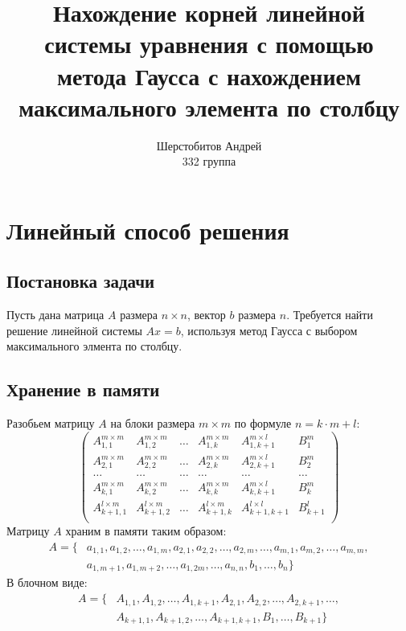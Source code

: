 \documentclass[12pt]{report}
\title{Нахождение корней 
    линейной системы уравнения
    с помощью метода Гаусса с 
    нахождением максимального элемента 
    по столбцу}
\author{Шерстобитов Андрей \\
         332 группа}
\begin{document}
    \maketitle
\newpage    
    \tableofcontents
    
\newpage
    \chapter{Линейный способ решения}
    \section{Постановка задачи} \label{lin:task}

    \quad Пусть дана матрица $A$ размера $n \times n$, вектор $b$ размера $n$. 
    Требуется найти решение линейной системы $Ax = b$, используя метод
    Гаусса с выбором максимального элмента по столбцу.
    

    \section{Хранение в памяти} \label{lin:mem}
    \quad Разобьем матрицу $A$ на блоки размера $m \times m$ 
    по формуле $ n = k \cdot m + l $:
    \[
    \left(
    \begin{array}{ccccc|c}
        A_{1,1}^{m \times m}   & A_{1,2}^{m \times m}   & \ldots & A_{1,k}^{m \times m}   & A_{1,k+1}^{m \times l}    & B^{m}_{1}   \\
        A_{2,1}^{m \times m}   & A_{2,2}^{m \times m}   & \ldots & A_{2,k}^{m \times m}   & A_{2,k+1}^{m \times l}    & B^{m}_{2}   \\
        \ldots                 & \ldots                 & \ldots & \ldots                 & \ldots                    & \ldots      \\
        A_{k,1}^{m \times m}   & A_{k,2}^{m \times m}   & \ldots & A_{k,k}^{m \times m}   & A_{k,k+1}^{m \times l}    & B^{m}_{k}   \\
        A_{k+1,1}^{l \times m} & A_{k+1,2}^{l \times m} & \ldots & A_{k+1,k}^{l \times m} & A_{k+1, k+1}^{l \times l} & B^{l}_{k+1} \\
    \end{array}
    \right)
    \]
    \quad Матрицу $A$ храним в памяти таким образом: 
        \begin{align*}
            A = \{&a_{1,1}, a_{1,2},  \ldots , a_{1,m},
                    a_{2,1}, a_{2,2}, \ldots , a_{2,m}, \ldots,
                    a_{m,1}, a_{m,2}, \ldots , a_{m,m}, \\
                    &a_{1,m+1}, a_{1,m+2}, \ldots , a_{1,2m}, \ldots, a_{n,n}, 
                    b_{1},\ldots, b_{n} \}
        \end{align*}
        \quad    В блочном виде:
        \begin{align*}
            A = \{&A_{1,1}, A_{1,2},\ldots , A_{1,k+1},
            A_{2,1}, A_{2,2},      \ldots , A_{2,k+1}, \ldots, \\
            &A_{k+1,1}, A_{k+1,2},  \ldots , A_{k+1,k+1},B_{1},\ldots, B_{k+1} \}
        \end{align*}
\end{document}

